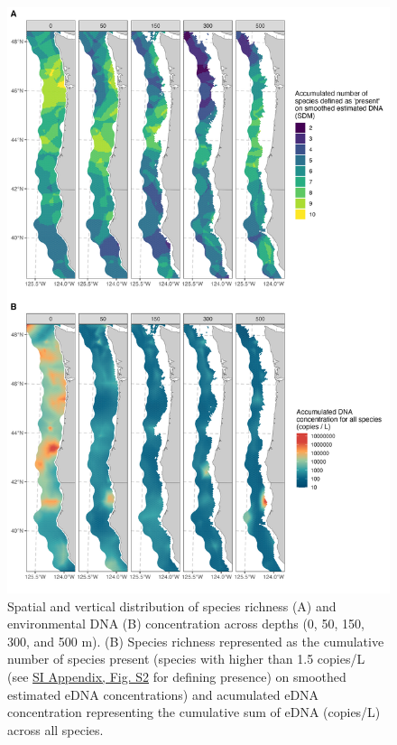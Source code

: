 \documentclass[9pt,twocolumn,twoside]{pnas-new}
\begin{document}
\begin{figure}[tbhp]  %
\centering
\includegraphics[width=14cm]{plots/3_Figure_3.jpg}  %
\caption{Spatial and vertical distribution of species richness (A) and environmental DNA (B) concentration across depths (0, 50, 150, 300, and 500 m). (B) Species richness represented as the cumulative number of species present (species with higher than 1.5 copies/L (see \href{SI_Appendix.pdf}{SI Appendix, Fig. S2} for defining presence) on smoothed estimated eDNA concentrations) and acumulated eDNA concentration representing the cumulative sum of eDNA (copies/L) across all species.}
\label{fig:fig3}
\end{figure}
\end{document}
